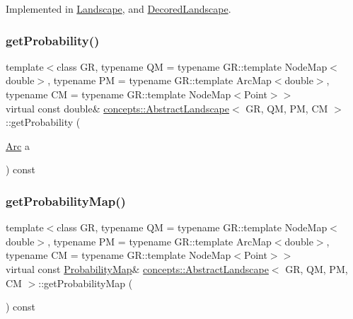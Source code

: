 Implemented in \hyperlink{class_landscape_a5f372f74530914d9128a036bbdaf7800}{Landscape}, and \hyperlink{class_decored_landscape_ae0cf946d7f221b0b7cbf89a645806d74}{Decored\+Landscape}.

\mbox{\label{classconcepts_1_1_abstract_landscape_af1e6dc428cff6f339cf1377c4487c781}} 
\subsubsection{\texorpdfstring{get\+Probability()}{getProbability()}}
{\footnotesize\ttfamily template$<$class GR, typename QM = typename G\+R\+::template Node\+Map$<$double$>$, typename PM = typename G\+R\+::template Arc\+Map$<$double$>$, typename CM = typename G\+R\+::template Node\+Map$<$\+Point$>$$>$ \\
virtual const double\& \hyperlink{classconcepts_1_1_abstract_landscape}{concepts\+::\+Abstract\+Landscape}$<$ GR, QM, PM, CM $>$\+::get\+Probability (\begin{DoxyParamCaption}\item[{\hyperlink{classconcepts_1_1_abstract_landscape_a0966623f028fe50ac9a3ae114dcf2672}{Arc}}]{a }\end{DoxyParamCaption}) const\hspace{0.3cm}{\ttfamily [pure virtual]}}

\mbox{\label{classconcepts_1_1_abstract_landscape_a4ecbe83965a5266a3a2fa14e201c5871}} 
\subsubsection{\texorpdfstring{get\+Probability\+Map()}{getProbabilityMap()}}
{\footnotesize\ttfamily template$<$class GR, typename QM = typename G\+R\+::template Node\+Map$<$double$>$, typename PM = typename G\+R\+::template Arc\+Map$<$double$>$, typename CM = typename G\+R\+::template Node\+Map$<$\+Point$>$$>$ \\
virtual const \hyperlink{classconcepts_1_1_abstract_landscape_ae90ffb759facff21b29e646539352182}{Probability\+Map}\& \hyperlink{classconcepts_1_1_abstract_landscape}{concepts\+::\+Abstract\+Landscape}$<$ GR, QM, PM, CM $>$\+::get\+Probability\+Map (\begin{DoxyParamCaption}{ }\end{DoxyParamCaption}) const\hspace{0.3cm}{\ttfamily [pure virtual]}}



